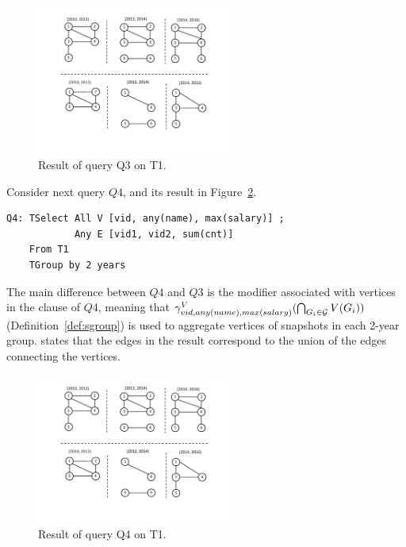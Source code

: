 \begin{figure}
\includegraphics[width=2.5in]{figs/TGroupAny.pdf}
\vspace{-0.1in}
\caption{Result of query Q3 on T1.}
\label{fig:q3}
\end{figure}

Consider next query $Q4$, and its result in
Figure~\ref{fig:tg_all_any}.

\begin{small}
\begin{verbatim}
Q4: TSelect All V [vid, any(name), max(salary)] ; 
            Any E [vid1, vid2, sum(cnt)] 
    From T1 
    TGroup by 2 years
\end{verbatim}
\end{small}

The main difference between $Q4$ and $Q3$ is the  modifier
associated with vertices in the  clause of $Q4$,
meaning that $\gamma^{V}_{vid, any(name), max(salary)}(\bigcap_{G_i
  \in {\cal G}} V(G_i))$ (Definition~\ref{def:sgroup}) is used to
aggregate vertices of snapshots in each 2-year group.  
states that the edges in the result correspond to the union of the
edges connecting the vertices.

\begin{figure}
\includegraphics[width=2.5in]{figs/TGroupAllAny.pdf}
\caption{Result of query Q4 on T1.}
\label{fig:tg_all_any}
\vspace{-0.1in}
\end{figure}

